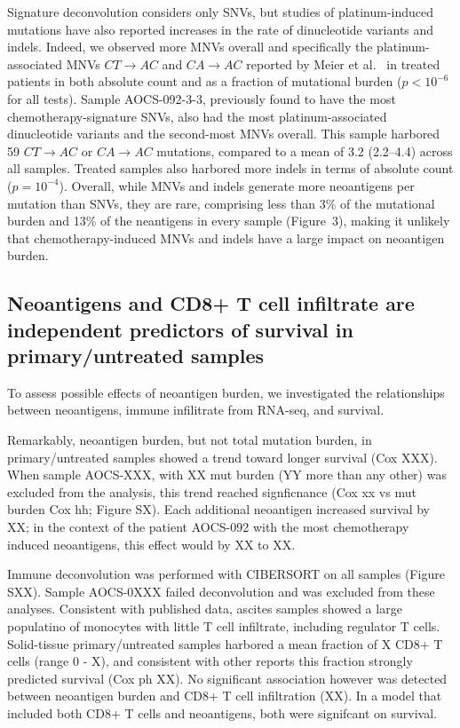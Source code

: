 \documentclass[linenumbers]{bmcart}
\begin{document}
Signature deconvolution considers only SNVs, but studies of platinum-induced mutations have also reported increases in the rate of dinucleotide variants and indels. Indeed, we observed more MNVs overall and specifically the platinum-associated MNVs $CT \rightarrow AC$ and $CA \rightarrow AC$ reported by Meier et al.~\cite{Meier_2014} in treated patients in both absolute count and as a fraction of mutational burden ($p < 10^{-6}$ for all tests). Sample AOCS-092-3-3, previously found to have the most chemotherapy-signature SNVs, also had the most platinum-associated dinucleotide variants and the second-most MNVs overall. This sample harbored 59 $CT \rightarrow AC$ or $CA \rightarrow AC$ mutations, compared to a mean of 3.2 (2.2--4.4) across all samples. Treated samples also harbored more indels in terms of absolute count ($p=10^{-4}$). Overall, while MNVs and indels generate more neoantigens per mutation than SNVs, they are rare, comprising less than 3\% of the mutational burden and 13\% of the neantigens in every sample (Figure~3), making it unlikely that chemotherapy-induced MNVs and indels have a large impact on neoantigen burden.

\subsection*{Neoantigens and CD8+ T cell infiltrate are independent predictors of survival in primary/untreated samples}

To assess possible effects of neoantigen burden, we investigated the relationships between neoantigens, immune infilitrate from RNA-seq, and survival.

Remarkably, neoantigen burden, but not total mutation burden, in primary/untreated samples showed a trend toward longer survival (Cox XXX). When sample AOCS-XXX, with XX mut burden (YY more than any other) was excluded from the analysis, this trend reached signficnance (Cox xx vs mut burden Cox hh; Figure SX). Each additional neoantigen increased survival by XX; in the context of the patient AOCS-092 with the most chemotherapy induced neoantigens, this effect would by XX to XX.

Immune deconvolution was performed with CIBERSORT on all samples (Figure SXX). Sample AOCS-0XXX failed deconvolution and was excluded from these analyses. Consistent with published data, ascites samples showed a large populatino of monocytes with little T cell infiltrate, including regulator T cells. Solid-tissue primary/untreated samples harbored a mean fraction of X CD8+ T cells (range 0 - X), and consistent with other reports this fraction strongly predicted survival (Cox ph XX). No significant association however was detected between neoantigen burden and CD8+ T cell infiltration (XX). In a model that included both CD8+ T cells and neoantigens, both were signifcant on survival.
\end{document}
